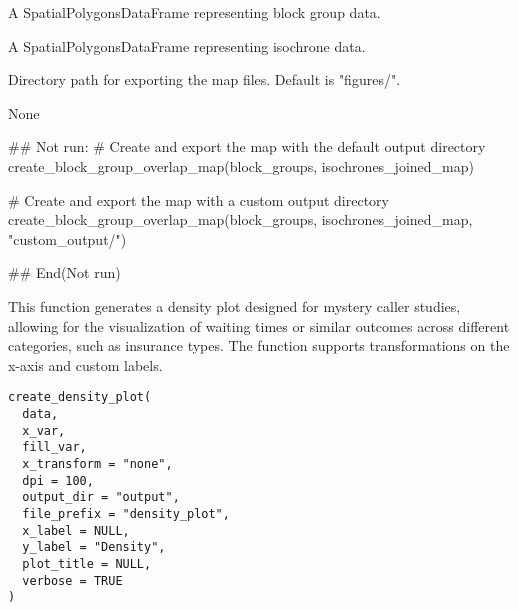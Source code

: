 \documentclass[a4paper]{book}
\begin{document}
%
\begin{Arguments}
\begin{ldescription}
\item[\code{bg\_data}] A SpatialPolygonsDataFrame representing block group data.

\item[\code{isochrones\_data}] A SpatialPolygonsDataFrame representing isochrone data.

\item[\code{output\_dir}] Directory path for exporting the map files. Default is "figures/".
\end{ldescription}
\end{Arguments}
%
\begin{Value}
None
\end{Value}
%
\begin{Examples}
\begin{ExampleCode}
## Not run: 
# Create and export the map with the default output directory
create_block_group_overlap_map(block_groups, isochrones_joined_map)

# Create and export the map with a custom output directory
create_block_group_overlap_map(block_groups, isochrones_joined_map, "custom_output/")

## End(Not run)

\end{ExampleCode}
\end{Examples}
%
\begin{Description}
This function generates a density plot designed for mystery caller studies, allowing for the visualization of waiting times or similar outcomes across different categories, such as insurance types. The function supports transformations on the x-axis and custom labels.
\end{Description}
%
\begin{Usage}
\begin{verbatim}
create_density_plot(
  data,
  x_var,
  fill_var,
  x_transform = "none",
  dpi = 100,
  output_dir = "output",
  file_prefix = "density_plot",
  x_label = NULL,
  y_label = "Density",
  plot_title = NULL,
  verbose = TRUE
)
\end{verbatim}
\end{Usage}
%
\end{document}
